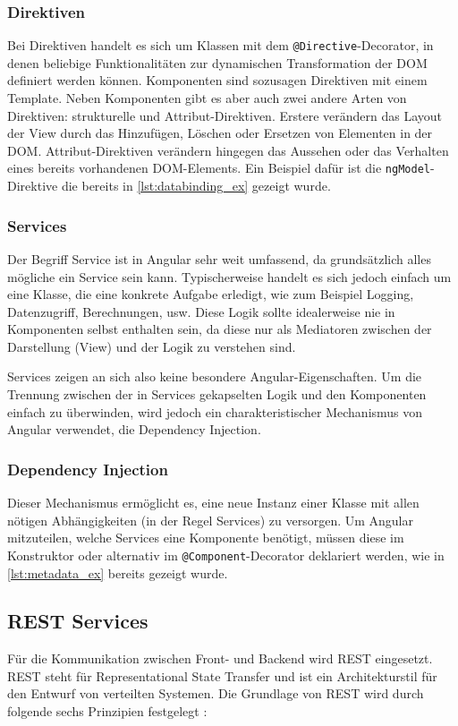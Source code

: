 \subsubsection{Direktiven}
Bei Direktiven handelt es sich um Klassen mit dem \texttt{@Directive}-Decorator, in denen beliebige Funktionalitäten zur dynamischen Transformation der DOM definiert werden können.
Komponenten sind sozusagen Direktiven mit einem Template. Neben Komponenten gibt es aber auch zwei andere Arten von Direktiven: strukturelle und Attribut-Direktiven.
Erstere verändern das Layout der View durch das Hinzufügen, Löschen oder Ersetzen von Elementen in der \acs{DOM}.
Attribut-Direktiven verändern hingegen das Aussehen oder das Verhalten eines bereits vorhandenen DOM-Elements.
Ein Beispiel dafür ist die \texttt{ngModel}-Direktive die bereits in \cref{lst:databinding_ex} gezeigt wurde.

\subsubsection{Services}
Der Begriff Service ist in Angular sehr weit umfassend, da grundsätzlich alles mögliche ein Service sein kann.
Typischerweise handelt es sich jedoch einfach um eine Klasse, die eine konkrete Aufgabe erledigt, wie zum Beispiel Logging, Datenzugriff, Berechnungen, usw.
Diese Logik sollte idealerweise nie in Komponenten selbst enthalten sein, da diese nur als Mediatoren zwischen der Darstellung (View) und der Logik zu verstehen sind.

Services zeigen an sich also keine besondere Angular-Eigenschaften. Um die Trennung zwischen der in Services gekapselten Logik und den Komponenten einfach zu überwinden, wird jedoch ein charakteristischer Mechanismus von Angular verwendet, die Dependency Injection.

\subsubsection{Dependency Injection}
Dieser Mechanismus ermöglicht es, eine neue Instanz einer Klasse mit allen nötigen Abhängigkeiten (in der Regel Services) zu versorgen.
Um Angular mitzuteilen, welche Services eine Komponente benötigt, müssen diese im Konstruktor oder alternativ im \texttt{@Component}-Decorator deklariert werden, wie in \cref{lst:metadata_ex} bereits gezeigt wurde.

\subsection{REST Services}
Für die Kommunikation zwischen Front- und Backend wird REST eingesetzt. REST steht für Representational State Transfer und ist ein Architekturstil für den Entwurf von verteilten Systemen. Die Grundlage von REST wird durch folgende sechs Prinzipien festgelegt \cite{Varanasi2015}:

